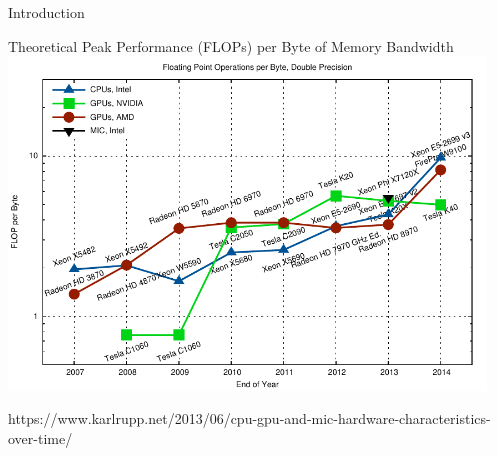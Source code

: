 \begin{frame}{Introduction}
 \vspace*{-0.5cm}
 \begin{center}
  Theoretical Peak Performance (FLOPs) per Byte of Memory Bandwidth \\
  \includegraphics[width=0.95\textwidth]{figures/flop-per-byte-dp}
 \end{center}
 \vspace*{-0.5cm}
 {\tiny https://www.karlrupp.net/2013/06/cpu-gpu-and-mic-hardware-characteristics-over-time/ }
\end{frame}

